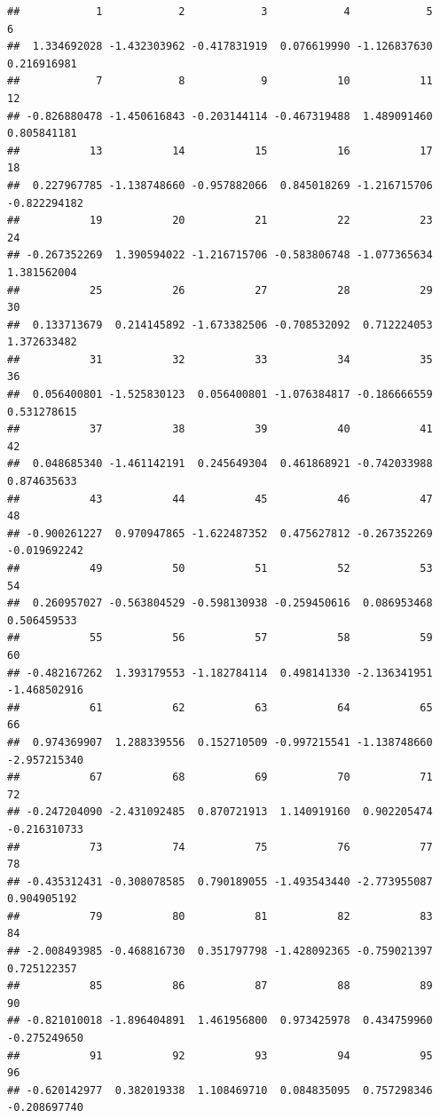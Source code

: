 \documentclass[
]{article}
\begin{document}
\begin{verbatim}
##            1            2            3            4            5            6 
##  1.334692028 -1.432303962 -0.417831919  0.076619990 -1.126837630  0.216916981 
##            7            8            9           10           11           12 
## -0.826880478 -1.450616843 -0.203144114 -0.467319488  1.489091460  0.805841181 
##           13           14           15           16           17           18 
##  0.227967785 -1.138748660 -0.957882066  0.845018269 -1.216715706 -0.822294182 
##           19           20           21           22           23           24 
## -0.267352269  1.390594022 -1.216715706 -0.583806748 -1.077365634  1.381562004 
##           25           26           27           28           29           30 
##  0.133713679  0.214145892 -1.673382506 -0.708532092  0.712224053  1.372633482 
##           31           32           33           34           35           36 
##  0.056400801 -1.525830123  0.056400801 -1.076384817 -0.186666559  0.531278615 
##           37           38           39           40           41           42 
##  0.048685340 -1.461142191  0.245649304  0.461868921 -0.742033988  0.874635633 
##           43           44           45           46           47           48 
## -0.900261227  0.970947865 -1.622487352  0.475627812 -0.267352269 -0.019692242 
##           49           50           51           52           53           54 
##  0.260957027 -0.563804529 -0.598130938 -0.259450616  0.086953468  0.506459533 
##           55           56           57           58           59           60 
## -0.482167262  1.393179553 -1.182784114  0.498141330 -2.136341951 -1.468502916 
##           61           62           63           64           65           66 
##  0.974369907  1.288339556  0.152710509 -0.997215541 -1.138748660 -2.957215340 
##           67           68           69           70           71           72 
## -0.247204090 -2.431092485  0.870721913  1.140919160  0.902205474 -0.216310733 
##           73           74           75           76           77           78 
## -0.435312431 -0.308078585  0.790189055 -1.493543440 -2.773955087  0.904905192 
##           79           80           81           82           83           84 
## -2.008493985 -0.468816730  0.351797798 -1.428092365 -0.759021397  0.725122357 
##           85           86           87           88           89           90 
## -0.821010018 -1.896404891  1.461956800  0.973425978  0.434759960 -0.275249650 
##           91           92           93           94           95           96 
## -0.620142977  0.382019338  1.108469710  0.084835095  0.757298346 -0.208697740 

\end{verbatim}
\end{document}
